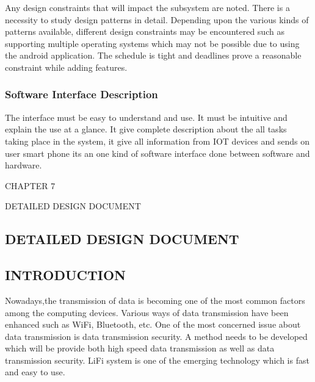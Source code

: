 \documentclass[12pt,a4paper]
{article}
\numberwithin{table}{section}
\begin{document}
{{{{{{Any design constraints that will impact the subsystem are noted. There is a necessity to study design patterns in detail. Depending upon the various kinds of patterns available, different design constraints may be encountered such as supporting multiple operating systems which may not be possible due to using the android application. The schedule is tight and deadlines prove a reasonable constraint while adding features.

\subsubsection{Software Interface Description}

The interface must be easy to understand and use. It must be intuitive and explain the use at a glance. It give complete description about the all tasks taking place in the system, it give all information from IOT devices and sends on user smart phone its an  one kind of software interface done between software and hardware. 







\newpage

\begin{minipage}{15cm}


\vspace{4 in}
 \begin{center} 
\begin{Huge}
CHAPTER 7

\vspace{0.5 in}

DETAILED DESIGN DOCUMENT
\end{Huge}

\end{center}
\end{minipage}

\newpage
\begin{center}
\section{DETAILED DESIGN DOCUMENT }
\end{center}
 {\setlength{\baselineskip}{1.0\baselineskip} 		
  \vspace{0.1in}
  
\subsection{INTRODUCTION}
 Nowadays,the transmission of data is becoming one of the most common factors among the computing devices. Various ways of data transmission have been enhanced such as WiFi, Bluetooth, etc. One of the most concerned issue about data transmission is data transmission security. A method needs to be developed which  will be provide both high speed data transmission as well as data transmission security. LiFi system is one of the emerging technology which is fast and easy to use.\\

}}}}}}}
\end{document}
